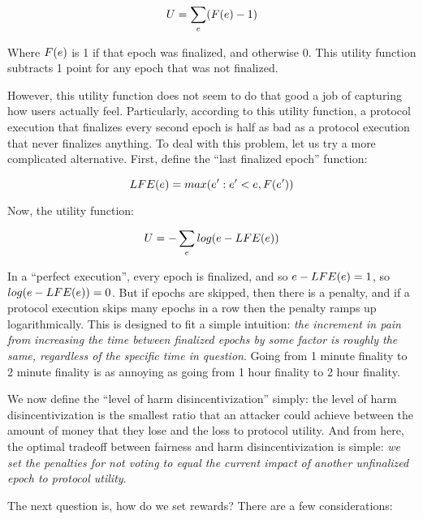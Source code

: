 \documentclass[12pt, final]{article}
\newcommand{\epoch}{\ensuremath{e}\space}
\begin{document}
$$U = \sum_{\epoch} (F(\epoch) - 1)$$

Where $F(\epoch)$ is 1 if that epoch was finalized, and otherwise 0. This utility function subtracts 1 point for any epoch that was not finalized.

However, this utility function does not seem to do that good a job of capturing how users actually feel. Particularly, according to this utility function, a protocol execution that finalizes every second epoch is half as bad as a protocol execution that never finalizes anything. To deal with this problem, let us try a more complicated alternative. First, define the ``last finalized epoch'' function:

$$LFE(\epoch) = max(\epoch': \epoch' < \epoch, F(\epoch'))$$

Now, the utility function:

$$U = -\sum_{\epoch} log(\epoch - LFE(\epoch))$$

In a ``perfect execution'', every epoch is finalized, and so $\epoch - LFE(\epoch) = 1$, so $log(\epoch - LFE(\epoch)) = 0$. But if epochs are skipped, then there is a penalty, and if a protocol execution skips many epochs in a row then the penalty ramps up logarithmically. This is designed to fit a simple intuition: \textit{the increment in pain from increasing the time between finalized epochs by some factor is roughly the same, regardless of the specific time in question}. Going from 1 minute finality to 2 minute finality is as annoying as going from 1 hour finality to 2 hour finality.

We now define the ``level of harm disincentivization'' simply: the level of harm disincentivization is the smallest ratio that an attacker could achieve between the amount of money that they lose and the loss to protocol utility. And from here, the optimal tradeoff between fairness and harm disincentivization is simple: \textit{we set the penalties for not voting to equal the current impact of another unfinalized epoch to protocol utility}.

The next question is, how do we set rewards? There are a few considerations:
\end{document}
